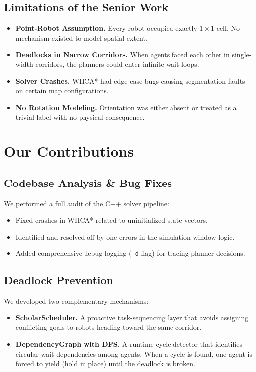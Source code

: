 \documentclass[12pt, a4paper]{article}
\begin{document}
\subsection{Limitations of the Senior Work}

\begin{itemize}
    \item \textbf{Point-Robot Assumption.} Every robot occupied exactly $1\times1$ cell. No mechanism existed to model spatial extent.
    \item \textbf{Deadlocks in Narrow Corridors.} When agents faced each other in single-width corridors, the planners could enter infinite wait-loops.
    \item \textbf{Solver Crashes.} WHCA* had edge-case bugs causing segmentation faults on certain map configurations.
    \item \textbf{No Rotation Modeling.} Orientation was either absent or treated as a trivial label with no physical consequence.
\end{itemize}

\section{Our Contributions}
\label{sec:ours}

\subsection{Codebase Analysis \& Bug Fixes}

We performed a full audit of the C++ solver pipeline:
\begin{itemize}
    \item Fixed crashes in WHCA* related to uninitialized state vectors.
    \item Identified and resolved off-by-one errors in the simulation window logic.
    \item Added comprehensive debug logging (\texttt{-d} flag) for tracing planner decisions.
\end{itemize}

\subsection{Deadlock Prevention}

We developed two complementary mechanisms:
\begin{itemize}
    \item \textbf{ScholarScheduler.} A proactive task-sequencing layer that avoids assigning conflicting goals to robots heading toward the same corridor.
    \item \textbf{DependencyGraph with DFS.} A runtime cycle-detector that identifies circular wait-dependencies among agents. When a cycle is found, one agent is forced to yield (hold in place) until the deadlock is broken.
\end{itemize}
\end{document}
